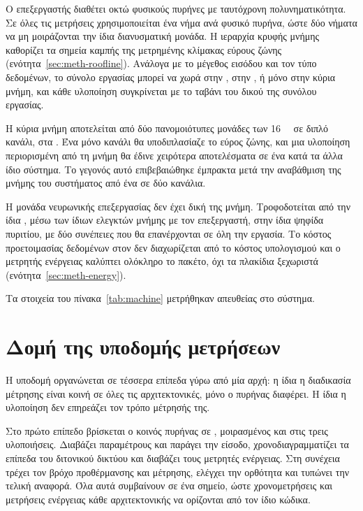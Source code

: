 Ο επεξεργαστής διαθέτει οκτώ φυσικούς πυρήνες με ταυτόχρονη πολυνηματικότητα.
Σε όλες τις μετρήσεις χρησιμοποιείται ένα νήμα ανά φυσικό πυρήνα, ώστε δύο
νήματα να μη μοιράζονται την ίδια διανυσματική μονάδα. Η ιεραρχία κρυφής μνήμης
καθορίζει τα σημεία καμπής της μετρημένης κλίμακας εύρους ζώνης
(ενότητα~\ref{sec:meth-roofline}). Ανάλογα με το μέγεθος εισόδου και τον τύπο
δεδομένων, το σύνολο εργασίας μπορεί να χωρά στην , στην , ή μόνο
στην κύρια μνήμη, και κάθε υλοποίηση συγκρίνεται με το ταβάνι του δικού της
συνόλου εργασίας.

Η κύρια μνήμη αποτελείται από δύο πανομοιότυπες μονάδες των
\qty{16}{\gibi\byte} σε διπλό κανάλι, στα . Ένα μόνο κανάλι θα
υποδιπλασίαζε το εύρος ζώνης, και μια υλοποίηση περιορισμένη από τη μνήμη θα
έδινε χειρότερα αποτελέσματα σε ένα κατά τα άλλα ίδιο σύστημα. Το γεγονός αυτό
επιβεβαιώθηκε έμπρακτα μετά την αναβάθμιση της μνήμης του συστήματος από ένα σε
δύο κανάλια.

Η μονάδα νευρωνικής επεξεργασίας δεν έχει δική της μνήμη. Τροφοδοτείται από την
ίδια , μέσω των ίδιων ελεγκτών μνήμης με τον επεξεργαστή, στην ίδια
ψηφίδα πυριτίου, με δύο συνέπειες που θα επανέρχονται σε όλη την εργασία. Το
κόστος προετοιμασίας δεδομένων στον  δεν διαχωρίζεται από το κόστος
υπολογισμού και ο μετρητής ενέργειας καλύπτει ολόκληρο το πακέτο, όχι τα
πλακίδια  ξεχωριστά (ενότητα~\ref{sec:meth-energy}).

Τα στοιχεία του πίνακα~\ref{tab:machine} μετρήθηκαν απευθείας στο σύστημα.

\section{Δομή της υποδομής μετρήσεων}
\label{sec:meth-harness}

Η υποδομή οργανώνεται σε τέσσερα επίπεδα γύρω από μία αρχή: η ίδια η διαδικασία
μέτρησης είναι κοινή σε όλες τις αρχιτεκτονικές, μόνο ο πυρήνας διαφέρει. Η
ίδια η υλοποίηση δεν επηρεάζει τον τρόπο μέτρησής της.

Στο πρώτο επίπεδο βρίσκεται ο κοινός πυρήνας σε , μοιρασμένος και στις
τρεις υλοποιήσεις. Διαβάζει παραμέτρους και παράγει την είσοδο,
χρονοδιαγραμματίζει τα επίπεδα του διτονικού δικτύου και διαβάζει τους μετρητές
ενέργειας. Στη συνέχεια τρέχει τον βρόχο προθέρμανσης και μέτρησης, ελέγχει την
ορθότητα και τυπώνει την τελική αναφορά. Όλα αυτά συμβαίνουν σε ένα σημείο,
ώστε χρονομετρήσεις και μετρήσεις ενέργειας κάθε αρχιτεκτονικής να ορίζονται
από τον ίδιο κώδικα.

